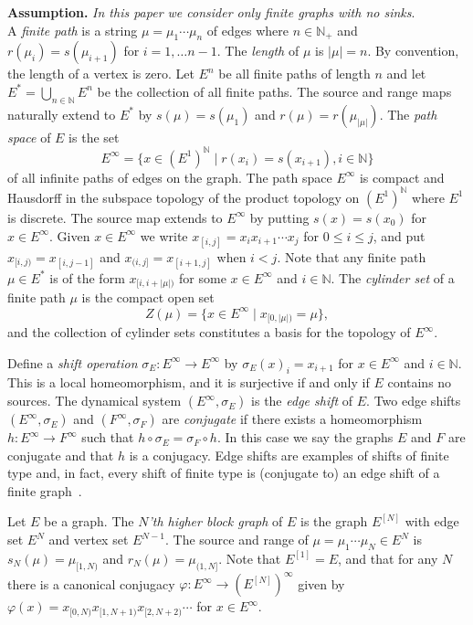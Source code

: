 \documentclass[12pt,a4paper,oneside,reqno,final]{amsart}
\newcommand{\LRA}{\longrightarrow}
\newcommand{\N}{\mathbb{N}}
\let\leq\leqslant{}
\theoremstyle{definition}
\numberwithin{equation}{section} %
\begin{document}
\textbf{Assumption.} \emph{In this paper we consider only finite graphs with no sinks}. \\

A \emph{finite path} is a string $\mu = \mu_1 \cdots \mu_n$ of edges
where $n\in \N_+$ and $r(\mu_i) = s(\mu_{i+1})$ for $i = 1,\ldots n-1$.
The \emph{length} of $\mu$ is $|\mu| = n$.
By convention, the length of a vertex is zero.
Let $E^n$ be all finite paths of length $n$ and let $E^* = \bigcup_{n \in \N} E^n$ be the collection of all finite paths.
The source and range maps naturally extend to $E^*$ by $s(\mu) = s(\mu_1)$ and $r(\mu) = r(\mu_{|\mu|})$.
The \emph{path space} of $E$ is the set
\[
    E^\infty = \{ x \in {(E^1)}^\N \mid  r(x_i) = s(x_{i + 1}), i\in \N\}
\]
of all infinite paths of edges on the graph.
The path space $E^\infty$ is compact and Hausdorff in the subspace topology of the product topology on ${(E^1)}^\N$ where $E^1$ is discrete.
The source map extends to $E^\infty$ by putting $s(x) = s(x_0)$ for $x\in E^\infty$.
Given $x\in E^\infty$ we write $x_{[i, j]} = x_i x_{i + 1} \cdots x_j$ for $0 \leq i \leq j$, and put
$x_{[i, j)} = x_{[i, j - 1]}$ and $x_{(i, j]} = x_{[i + 1, j]}$ when $i < j$.
Note that any finite path $\mu \in E^*$ is of the form $x_{[i, i + |\mu|)}$ for some $x\in E^\infty$ and $i\in \N$.
The \emph{cylinder set} of a finite path $\mu$ is the compact open set
\[
    Z(\mu) = \{ x\in E^\infty \mid x_{[0, |\mu|)} = \mu \},
\]
and the collection of cylinder sets constitutes a basis for the topology of $E^\infty$.

Define a \emph{shift operation} $\sigma_E\colon E^\infty \LRA E^\infty$ by $\sigma_E(x)_i = x_{i + 1}$ for $x\in E^\infty$ and $i\in \N$.
This is a local homeomorphism, and it is surjective if and only if $E$ contains no sources.
The dynamical system $(E^\infty, \sigma_E)$ is the \emph{edge shift} of $E$.
Two edge shifts $(E^\infty, \sigma_E)$ and $(F^\infty, \sigma_F)$ are \emph{conjugate} if there exists a homeomorphism $h\colon E^\infty \LRA F^\infty$
such that $h\circ \sigma_E = \sigma_F\circ h$.
In this case we say the graphs $E$ and $F$ are conjugate and that $h$ is a conjugacy.
Edge shifts are examples of shifts of finite type and, in fact, every shift of finite type is (conjugate to) an edge shift of a finite graph~\cite[Section 2]{LM}.

Let $E$ be a graph.
The \emph{$N$'th higher block graph} of $E$ is the graph $E^{[N]}$ with edge set $E^N$ and vertex set $E^{N - 1}$.
The source and range of $\mu = \mu_1 \cdots \mu_N\in E^N$ is $s_N(\mu) = \mu_{[1, N)}$ and $r_N(\mu) = \mu_{(1, N]}$.
Note that $E^{[1]} = E$, and that for any $N$ there is a canonical conjugacy $\varphi\colon E^\infty \LRA {(E^{[N]})}^\infty$ 
given by $\varphi(x) = x_{[0, N)} x_{[1, N + 1)} x_{[2, N + 2)}\cdots$ for $x\in E^\infty$.
\end{document}

